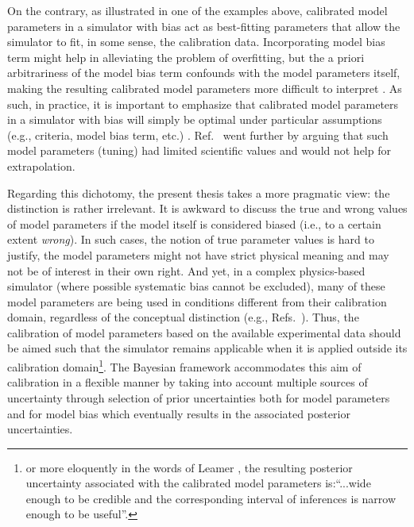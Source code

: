 On the contrary, as illustrated in one of the examples above, calibrated model parameters in a simulator with bias act as best-fitting parameters that allow the simulator to fit, in some sense, the calibration data.
Incorporating model bias term might help in alleviating the problem of overfitting, but the a priori arbitrariness of the model bias term confounds with the model parameters itself, making the resulting calibrated model parameters more difficult to interpret \cite{Higdon2004}.
As such, in practice, it is important to emphasize that calibrated model parameters in a simulator with bias will simply be optimal under particular assumptions (e.g., criteria, model bias term, etc.) \cite{Campbell2006}.
Ref.~\cite{Brynjarsdottir2014} went further by arguing that such model parameters (tuning) had limited scientific values and would not help for extrapolation.

Regarding this dichotomy, the present thesis takes a more pragmatic view: the distinction is rather irrelevant.
It is awkward to discuss the true and wrong values of model parameters if the model itself is considered biased (i.e., to a certain extent \emph{wrong}).
In such cases, the notion of true parameter values is hard to justify, the model parameters might not have strict physical meaning and may not be of interest in their own right.
And yet, in a complex physics-based simulator (where possible systematic bias cannot be excluded), many of these model parameters are being used in conditions different from their calibration domain, regardless of the conceptual distinction (e.g., Refs.~\cite{Arendt2012,USNRC2012}).
Thus, the calibration of model parameters based on the available experimental data should be aimed such that the simulator remains applicable when it is applied outside its calibration domain\footnote{or more eloquently in the words of Leamer \cite{Saltelli2006}, the resulting posterior uncertainty associated with the calibrated model parameters is:``...wide enough to be credible and the corresponding interval of inferences is narrow enough to be useful''.}.
The Bayesian framework accommodates this aim of calibration in a flexible manner by taking into account multiple sources of uncertainty through selection of prior uncertainties both for model parameters and for model bias which eventually results in the associated posterior uncertainties.

